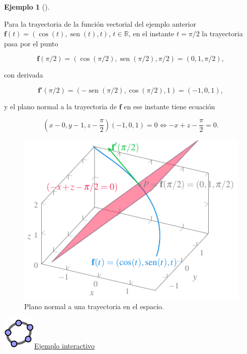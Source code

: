 \documentclass[
  a4paper,
]{scrreport}
\theoremstyle{definition}
\newtheorem{example}{Ejemplo}[chapter]
\theoremstyle{plain}
\theoremstyle{definition}
\theoremstyle{definition}
\theoremstyle{plain}
\theoremstyle{plain}
\theoremstyle{remark}
\begin{document}
\begin{example}[]\protect\hypertarget{exm-plano-normal-trayectoria-espacio}{}\label{exm-plano-normal-trayectoria-espacio}

Para la trayectoria de la función vectorial del ejemplo anterior
\(\mathbf{f}(t)=(\cos(t), \operatorname{sen}(t), t)\),
\(t\in \mathbb{R}\), en el instante \(t=\pi/2\) la trayectoria pasa por
el punto

\[
\mathbf{f}(\pi/2)=(\cos(\pi/2),\operatorname{sen}(\pi/2),\pi/2)=(0,1,\pi/2),
\]

con derivada

\[
\mathbf{f}'(\pi/2)=(-\operatorname{sen}(\pi/2),\cos(\pi/2), 1)=(-1,0,1),
\]

y el plano normal a la trayectoria de \(\mathbf{f}\) en ese instante
tiene ecuación

\[
\left(x-0,y-1,z-\frac{\pi}{2}\right)(-1,0,1) =0 \Leftrightarrow -x+z-\frac{\pi}{2}=0.
\]

\begin{figure}[H]

{\centering \includegraphics{img/funciones-vectoriales/plano-normal-trayectoria-espacio.pdf}

}

\caption{Plano normal a una trayectoria en el espacio.}

\end{figure}%

\href{https://www.geogebra.org/m/Q2C7EfBn}{\includegraphics{img/logos/logo-geogebra.png}Ejemplo
interactivo}

\end{example}
\end{document}
